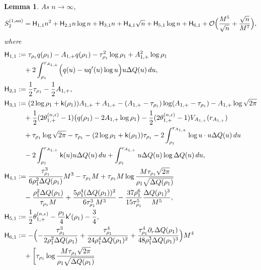 \documentclass[a4paper]{article}
\newtheorem{lemma}[theorem]{Lemma}
\numberwithin{equation}{section}
\begin{document}
\begin{lemma}\label{lemma: hard edge g1+ j j1+ first}
As $n\to\infty$,
\begin{equation}
    \label{def of S2(1) an}
    S_{2}^{(1,\mathrm{an})}=
\mathsf{H}_{1,1}n^2
+\mathsf{H}_{2,1}n\log n
+\mathsf{H}_{3,1}n
+\mathsf{H}_{4,1}\sqrt{n}
+\mathsf{H}_{5,1}\log n
+\mathsf{H}_{6,1}
+\mathcal{O}\Bigl(\frac{M^5}{\sqrt{n}}+\frac{\sqrt{n}}{M^7}\Bigr),
\end{equation}
where 
\begin{align*}
\mathsf{H}_{1,1}&:=
\tau_{\rho_1}q(\rho_1)
-A_{1,+}q(\rho_1)
-\tau_{\rho_1}^2\log \rho_1
+A_{1,+}^2\log \rho_1
\\
&\quad
+2\int_{\rho_1}^{r_{A_{1,+}}}\Bigl(q(u)-uq'(u)\log u\Bigr)u\Delta Q(u)\,du,
\\
\mathsf{H}_{2,1}&:= 
\frac{1}{2}\tau_{\rho_1}-\frac{1}{2}A_{1,+},
\\
\mathsf{H}_{3,1}&:=
(2\log \rho_1+\mathsf{k}(\rho_1))A_{1,+}
+A_{1,+}
-(A_{1,+}-\tau_{\rho_1})\log(A_{1,+}-\tau_{\rho_1})
-A_{1,+}\log\sqrt{2\pi}
\\
&\quad
+\frac{1}{2}(2\theta_{1,+}^{(n,\epsilon)}-1)\bigl(q(\rho_1)-2A_{1,+}\log\rho_1\bigr)
-\frac{1}{2}(2\theta_{1,+}^{(n,\epsilon)}-1)V_{A_{1,+}}(r_{A_{1,+}})
\\
&\quad
+\tau_{\rho_1}\log\sqrt{2\pi}
-\tau_{\rho_1}
-(2\log \rho_1+\mathsf{k}(\rho_1))\tau_{\rho_1}
-2\int_{\rho_1}^{r_{A_{1,+}}}\log u \cdot u\Delta Q(u)\,du
\\
&\quad 
-2\int_{\rho_1}^{r_{A_{1,+}}}\mathsf{k}(u)u\Delta Q(u)\,du
+\int_{\rho_1}^{r_{A_{1,+}}}u\Delta Q(u)\log \Delta Q(u)\,du,
\\
\mathsf{H}_{4,1}&:=  
\frac{\tau_{\rho_1}^3}{6\rho_1^2\Delta Q(\rho_1)}M^3
-\tau_{\rho_1}M
+\tau_{\rho_1}M\log\frac{M\tau_{\rho_1}\sqrt{2\pi}}{\rho_1\sqrt{\Delta Q(\rho_1)}}
\\
&\quad
-\frac{\rho_1^2\Delta Q(\rho_1)}{\tau_{\rho_1}M}
+\frac{5\rho_1^4(\Delta Q(\rho_1))^2}{6\tau_{\rho_1}^3M^3}
-\frac{37\rho_1^6}{15\tau_{\rho_1}^5}\frac{\Delta Q(\rho_1)^3}{M^5},
\\
\mathsf{H}_{5,1}&:=  
\frac{1}{2}\theta_{1,+}^{(n,\epsilon)}
-\frac{\rho_1}{4}\mathsf{k}'(\rho_1)-\frac{3}{4},
\\
\mathsf{H}_{6,1}&:=  
-\Bigl( 
-\frac{\tau_{\rho_1}^3}{2\rho_1^2\Delta Q(\rho_1)}
+\frac{\tau_{\rho_1}^4}{24\rho_1^4\Delta Q(\rho_1)^2}
+\frac{\tau_{\rho_1}^4\partial_r\Delta Q(\rho_1)}{48\rho_1^3\Delta Q(\rho_1)^3}
\Bigr)M^4
\\
&\quad
+\bigg[
\tau_{\rho_1}\log\frac{M\tau_{\rho_1}\sqrt{2\pi}}{\rho_1\sqrt{\Delta Q(\rho_1)}}

\end{align*}
\end{lemma}
\end{document}
